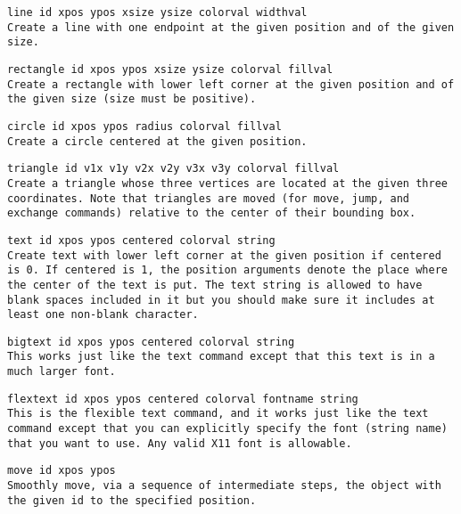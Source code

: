 \quest
\tt line id xpos ypos xsize ysize colorval widthval\\
\hspace*{3ex} \rm Create a line with one endpoint at the given
position and of the given size.

\quest
\tt rectangle id xpos ypos xsize ysize colorval fillval\\
\hspace*{3ex} \rm Create a rectangle with lower left corner at the
given position and of the given size (size must be positive).

\quest
\tt circle id xpos ypos radius colorval fillval\\
\hspace*{3ex} \rm Create a circle centered at the given position.

\quest
\tt triangle id v1x v1y v2x v2y v3x v3y colorval fillval\\
\hspace*{3ex} \rm Create a triangle whose three vertices are located
at the given three coordinates.  Note that triangles are moved (for
move, jump, and exchange commands) relative to the center of their
bounding box.

\quest
\tt text id xpos ypos centered colorval string\\
\hspace*{3ex} \rm Create text with lower left corner at the given
position if {\tt centered} is 0.  If {\tt centered} is 1, the position
arguments denote the place where the center of the text is put.  
The text string is allowed to have blank spaces included in it but you
should make sure it includes at least one non-blank character.

\quest
\tt bigtext id xpos ypos centered colorval string\\
\hspace*{3ex} \rm This works just like the text command except that
this text is in a much larger font.  

\quest
\tt flextext id xpos ypos centered colorval fontname string\\
\hspace*{3ex} \rm This is the flexible text command, and it works just
like the text command except that you can explicitly specify the font
(string name) that you want to use.  Any valid X11 font is allowable.

\quest
\tt move id xpos ypos\\
\hspace*{3ex} \rm Smoothly move, via a sequence of intermediate steps, the object with the given id to the specified
position.

